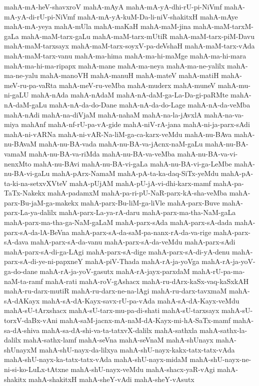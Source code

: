 {mahA-mA-heV-shavxroV
mahA-mAyA
mahA-mA-yA-dhi-rU-pi-NiVmf
mahA-mA-yA-di-rU-pi-NiVmf
mahA-mA-yA-kuM-Da-li-niV-shakitxH
mahA-mAye
mahA-mA-yeya
mahA-mUla
mahA-maKaH
mahA-maM-jina
mahA-maM-tarxM-gaLa
mahA-maM-tarx-gaLu
mahA-maM-tarx-mUtiR
mahA-maM-tarx-piM-Davu
mahA-maM-tarxsayx
mahA-maM-tarx-soyxV-pa-deVshaH
mahA-maM-tarx-vAda
mahA-maM-tarx-vanu
mahA-ma-hima
mahA-ma-hi-maMge
mahA-ma-hi-mara
mahA-ma-hi-ma-ripapx
mahA-mane
mahA-ma-neya
mahA-ma-ne-yalilx
mahA-ma-ne-yalu
mahA-manoVH
mahA-manuH
mahA-mateV
mahA-matiH
mahA-meV-ru-pa-vaRta
mahA-meV-ru-veMba
mahA-muderx
mahA-muneV
mahA-mu-ni-gaLU
mahA-nAda
mahA-nAdaM
mahA-nA-daM-ga-La-Da-gi-paRMte
mahA-nA-daM-gaLu
mahA-nA-da-do-Dane
mahA-nA-da-do-Lage
mahA-nA-da-veMba
mahA-nAdi
mahA-na-diVjaM
mahA-nahaM
mahA-na-la-jAvxlA
mahA-na-va-miya
mahAnf
mahA-nf-rU-pa-vA-gide
mahA-niV-rA-jana
mahA-ni-ja-parx-sAdi
mahA-ni-vARNa
mahA-ni-vAR-Na-liM-ga-ca-karx-veMdu
mahA-nu-BAva
mahA-nu-BAvaM
mahA-nu-BA-vada
mahA-nu-BA-va-jAcnx-naM-gaLu
mahA-nu-BA-vamaM
mahA-nu-BA-va-riMda
mahA-nu-BA-va-veMba
mahA-nu-BA-va-vi-nenxMto
mahA-nu-BAvi
mahA-nu-BA-vi-gaLa
mahA-nu-BA-vi-ga-LeMbe
mahA-nu-BA-vi-gaLu
mahA-pArx-NamaM
mahA-pA-ta-ka-daq-SiTx-yeMdu
mahA-pA-ta-ki-na-setxvXVteV
mahA-pUjAM
mahA-pU-jA-vi-dhi-karx-mamf
mahA-pa-TaTx-Nakekx
mahA-padamxM
mahA-pa-ri-pU-NaR-parx-kA-sha-veMba
mahA-parx-Bu-jaM-ga-makekx
mahA-parx-Bu-liM-ga-liVle
mahA-parx-Buve
mahA-parx-La-ya-dalilx
mahA-parx-La-ya-rA-daru
mahA-parx-ma-tha-NaM-gaLa
mahA-parx-ma-tha-ga-NaM-gaLaM
mahA-parx-sAda
mahA-parx-sA-dada
mahA-parx-sA-da-lA-BeVna
mahA-parx-sA-da-saM-pa-nanx-rA-da-va-rige
mahA-parx-sA-dava
mahA-parx-sA-da-vanu
mahA-parx-sA-da-veMdu
mahA-parx-sAdi
mahA-parx-sA-di-ga-LAgi
mahA-parx-sA-dige
mahA-parx-sA-di-yA-denu
mahA-parx-sA-di-ye-ni-papxneY
mahA-piV-Thada
mahA-rA-ja-yoVga
mahA-rA-ja-yoV-ga-do-dane
mahA-rA-ja-yoV-gasutx
mahA-rA-jayx-parxdaM
mahA-rU-pa-ma-naM-ta-ramf
mahA-rati
mahA-roV-gAshacx
mahA-ru-dArx-kaSx-vaq-kaSxkAH
mahA-ru-darx-mutiR
mahA-ru-darx-ne-na-lAgi
mahA-ru-darx-tavxmaM
mahA-sA-dAKayx
mahA-sA-dA-Kayx-savx-rU-pa-vAda
mahA-sA-dA-Kayx-veMdu
mahA-sU-tArxshacx
mahA-sU-tarx-mu-pa-di-shati
mahA-sU-tarxsayx
mahA-sU-torxV-daBx-vAni
mahA-saM-jacnx-mA-naM-dA-Kayx-mi-hA-SaTx-mamf
mahA-sa-dA-shiva
mahA-sa-dA-shi-va-ta-tatxvX-dalilx
mahA-sathxla
mahA-sathx-la-dalilx
mahA-sathx-lamf
mahA-seVna
mahA-seVnaM
mahA-shUnayx
mahA-shUnayxM
mahA-shU-nayx-da-lilxya
mahA-shU-nayx-kakx-tatx-tatx-vAda
mahA-shU-nayx-ka-tatx-tatx-vAda
mahA-shU-nayx-midaM
mahA-shU-nayx-ne-ni-si-ko-LuLx-tAtxne
mahA-shU-nayx-veMdu
mahA-shacx-yaR-vAgi
mahA-shakitx
mahA-shakitxH
mahA-sheY-vAdi
mahA-sheY-vAsutx
}
